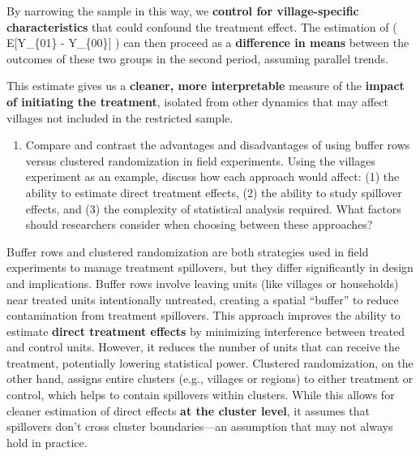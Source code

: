 \documentclass[
  letterpaper,
  DIV=11,
  numbers=noendperiod]{scrartcl}
\providecommand{\tightlist}{%
  \setlength{\itemsep}{0pt}\setlength{\parskip}{0pt}}\usepackage{longtable,booktabs,array}
\begin{document}
By narrowing the sample in this way, we \textbf{control for
village-specific characteristics} that could confound the treatment
effect. The estimation of ( E{[}Y\_\{01\} - Y\_\{00\}{]} ) can then
proceed as a \textbf{difference in means} between the outcomes of these
two groups in the second period, assuming parallel trends.

This estimate gives us a \textbf{cleaner, more interpretable} measure of
the \textbf{impact of initiating the treatment}, isolated from other
dynamics that may affect villages not included in the restricted sample.

\begin{enumerate}
\def\labelenumi{\arabic{enumi}.}
\setcounter{enumi}{3}
\tightlist
\item
  Compare and contrast the advantages and disadvantages of using buffer
  rows versus clustered randomization in field experiments. Using the
  villages experiment as an example, discuss how each approach would
  affect: (1) the ability to estimate direct treatment effects, (2) the
  ability to study spillover effects, and (3) the complexity of
  statistical analysis required. What factors should researchers
  consider when choosing between these approaches?
\end{enumerate}

Buffer rows and clustered randomization are both strategies used in
field experiments to manage treatment spillovers, but they differ
significantly in design and implications. Buffer rows involve leaving
units (like villages or households) near treated units intentionally
untreated, creating a spatial ``buffer'' to reduce contamination from
treatment spillovers. This approach improves the ability to estimate
\textbf{direct treatment effects} by minimizing interference between
treated and control units. However, it reduces the number of units that
can receive the treatment, potentially lowering statistical power.
Clustered randomization, on the other hand, assigns entire clusters
(e.g., villages or regions) to either treatment or control, which helps
to contain spillovers within clusters. While this allows for cleaner
estimation of direct effects \textbf{at the cluster level}, it assumes
that spillovers don't cross cluster boundaries---an assumption that may
not always hold in practice.
\end{document}

